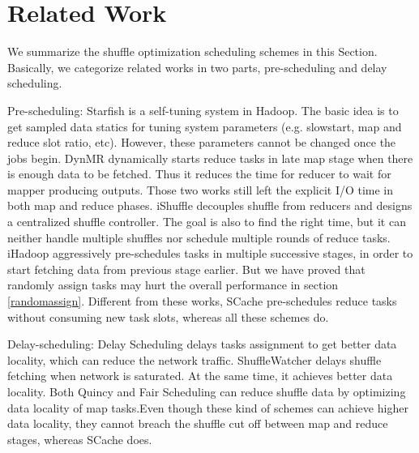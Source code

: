\section{Related Work}
We summarize the shuffle optimization scheduling schemes in this Section. Basically, we categorize related works in two parts, pre-scheduling and delay scheduling.

Pre-scheduling: Starfish \cite{starfish} is a self-tuning system in Hadoop. The basic idea is to get sampled data statics for tuning system parameters (e.g. slowstart, map and reduce slot ratio, etc). However, these parameters cannot be changed once the jobs begin. DynMR \cite{dynmr} dynamically starts reduce tasks in late map stage when there is enough data to be fetched. Thus it reduces the time for reducer to wait for mapper producing outputs. Those two works still left the explicit I/O time in both map and reduce phases. iShuffle \cite{ishuffle} decouples shuffle from reducers and designs a centralized shuffle controller. The goal is also to find the right time, but it can neither handle multiple shuffles nor schedule multiple rounds of reduce tasks. iHadoop \cite{ihadoop} aggressively pre-schedules tasks in multiple successive stages, in order to start fetching data from previous stage earlier. But we have proved that randomly assign tasks may hurt the overall performance in section \ref{randomassign}. Different from these works, SCache pre-schedules reduce tasks without consuming new task slots, whereas all these schemes do.

Delay-scheduling: Delay Scheduling \cite{delay} delays tasks assignment to get better data locality, which can reduce the network traffic. ShuffleWatcher \cite{shufflewatcher} delays shuffle fetching when network is saturated. At the same time, it achieves better data locality. Both Quincy \cite{quincy} and Fair Scheduling \cite{preemptive} can reduce shuffle data by optimizing data locality of map tasks.Even though these kind of schemes can achieve higher data locality, they cannot breach the shuffle cut off between map and reduce stages, whereas SCache does. 